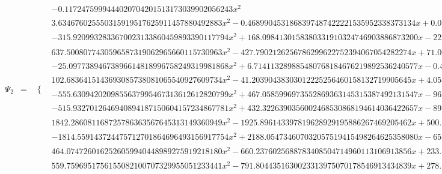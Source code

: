 \documentclass{article}
\begin{document}
\begin{landscape}
\begin{eqnarray*}
\begin{array}{cc}
\end{array}\\
\Psi_2 & = & \begin{array}{cc}
 \{ & 
\begin{array}{cc}
 -0.1172475999444020704201513173039902056243 x^2 & x\geq 0\land x<\frac{1}{16} \\
 3.634676025550315919517625911457880492883 x^2-0.4689904531868397487422221535952338373134 x+0.01465595166208874214819444229985105741604 & x\geq \frac{1}{16}\land x<\frac{1}{8} \\
 -315.9209932833670023133860459893390117794 x^2+168.0984130158380331910324746903886873200 x-22.10476355030261293741412644614327018541 & x\geq \frac{1}{4}\land x<\frac{5}{16} \\
 637.5008077430596587319062965660115730963 x^2-427.7902126256786299622752394067054282274 x+71.00283420618436568029020388152768536886 & x\geq \frac{5}{16}\land x<\frac{3}{8} \\
 -25.09773894673896614818996758249319981868 x^2+6.714113289885480768184676219892536240577 x-0.4342880322799312901597367060431345724521 & x\geq \frac{1}{8}\land x<\frac{3}{16} \\
 102.6836415143693085738081065540927609734 x^2-41.20390438303012225256460158132719905645 x+4.058026124555906493035508087821215611644 & x\geq \frac{3}{16}\land x<\frac{1}{4} \\
 -555.6309420209855637995467313612612820799 x^2+467.0585996973552869363145315387492131547 x-96.78131810438449373819537817074505989028 & x\geq \frac{3}{8}\land x<\frac{7}{16} \\
 -515.9327012646940894187150604157234867781 x^2+432.3226390356002468530868194614036422657 x-89.18282670962557871998931615382571625831 & x\geq \frac{7}{16}\land x<\frac{1}{2} \\
 1842.286081168725786363567645313149360949 x^2-1925.896143397819628929195886267469205462 x+500.3718688987293902255813602783924956736 & x\geq \frac{1}{2}\land x<\frac{9}{16} \\
 -1814.559143724475712701864696493156917754 x^2+2188.054734607032057519415498264625358080 x-656.6768155401351465880905916212591003225 & x\geq \frac{9}{16}\land x<\frac{5}{8} \\
 464.0747260162526059940448989275919218180 x^2-660.2376025688783408504714960113106913856 x+233.4145398273368529024990940899709151354 & x\geq \frac{5}{8}\land x<\frac{11}{16} \\
 559.7596951756155082100707329955051233441 x^2-791.8044351630023313975070178546913434839 x+278.6406385315669746530425547236330142942 & x\geq \frac{11}{16}\land x<\frac{3}{4} \\

\end{array}
\end{array}
\end{eqnarray*}
\end{landscape}
\end{document}
